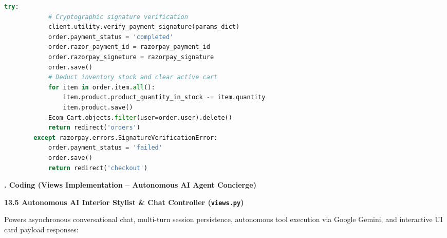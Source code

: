 \documentclass[12pt,a4paper]{article}
\begin{document}
\begin{lstlisting}[language=Python, caption={Order Processing and Razorpay Payment Verification (furnish/views.py)}, label={lst:payment_views}]
        try:
            # Cryptographic signature verification
            client.utility.verify_payment_signature(params_dict)
            order.payment_status = 'completed'
            order.razor_payment_id = razorpay_payment_id
            order.razorpay_signeture = razorpay_signature
            order.save()
            # Deduct inventory stock and clear active cart
            for item in order.item.all():
                item.product.product_quantity_in_stock -= item.quantity
                item.product.save()
            Ecom_Cart.objects.filter(user=order.user).delete()
            return redirect('orders')
        except razorpay.errors.SignatureVerificationError:
            order.payment_status = 'failed'
            order.save()
            return redirect('checkout')
\end{lstlisting}

\vfill

\newpage



\noindent
{\color{bcetblue}\textbf{\fontsize{14}{18}. Coding (Views Implementation -- Autonomous AI Agent Concierge)}}

\vspace{0.08in}

{\fontsize{13}{18}\selectfont
\begin{spacing}{1.15}

\noindent
\textbf{13.5 Autonomous AI Interior Stylist \& Chat Controller (\texttt{views.py})}

\vspace{0.04in}

\noindent
{\fontsize{11}{14}\selectfont Powers asynchronous conversational chat, multi-turn session persistence, autonomous tool execution via Google Gemini, and interactive UI card payload responses:}

\end{spacing}
}

\vspace{0.06in}
\end{document}
